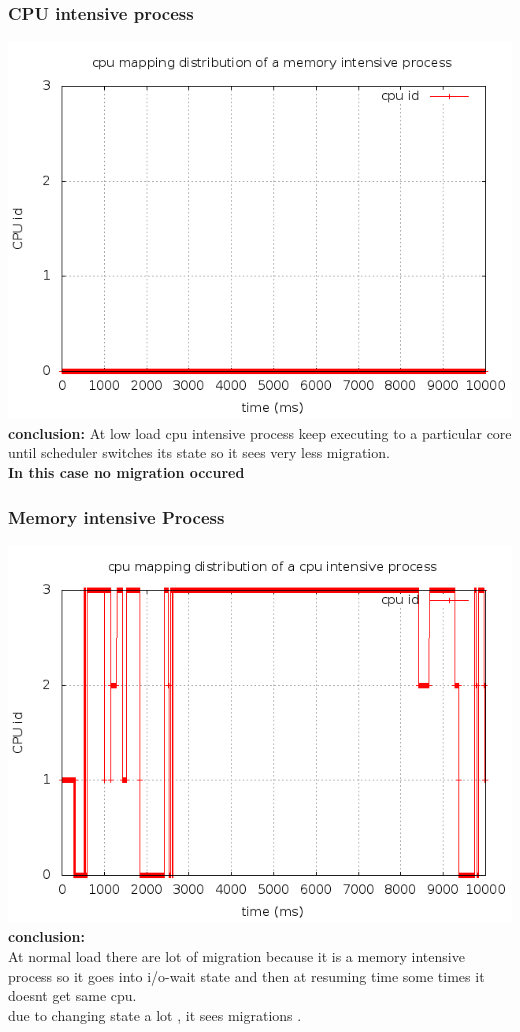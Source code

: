 \documentclass[a4paper,11pt]{report}
\begin{document}
  \subsubsection{CPU intensive process}
  \includegraphics[scale=0.5]{memcurr_cpu.png}\\
  {\bf conclusion:} At low load cpu intensive process keep executing to a particular core until scheduler switches its state
  so it sees very less migration.\\
  {\bf In this case no migration occured}
  \subsubsection{Memory intensive Process}
  \includegraphics[scale=0.5]{curr_cpu.png}\\ 
  {\bf conclusion:} \\At normal load there are lot of migration because it is a memory intensive process so it goes into i/o-wait state and then at resuming time some times it doesnt get same cpu.\\
  due to changing state a lot , it sees migrations . 
\end{document}
